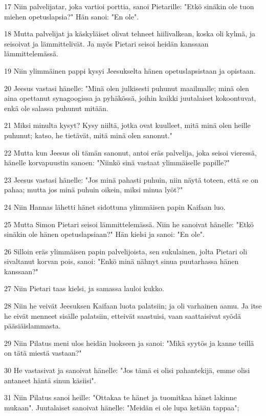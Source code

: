 \par 17 Niin palvelijatar, joka vartioi porttia, sanoi Pietarille: "Etkö sinäkin ole tuon miehen opetuslapsia?" Hän sanoi: "En ole".
\par 18 Mutta palvelijat ja käskyläiset olivat tehneet hiilivalkean, koska oli kylmä, ja seisoivat ja lämmittelivät. Ja myös Pietari seisoi heidän kanssaan lämmittelemässä.
\par 19 Niin ylimmäinen pappi kysyi Jeesukselta hänen opetuslapsistaan ja opistaan.
\par 20 Jeesus vastasi hänelle: "Minä olen julkisesti puhunut maailmalle; minä olen aina opettanut synagoogissa ja pyhäkössä, joihin kaikki juutalaiset kokoontuvat, enkä ole salassa puhunut mitään.
\par 21 Miksi minulta kysyt? Kysy niiltä, jotka ovat kuulleet, mitä minä olen heille puhunut; katso, he tietävät, mitä minä olen sanonut."
\par 22 Mutta kun Jeesus oli tämän sanonut, antoi eräs palvelija, joka seisoi vieressä, hänelle korvapuustin sanoen: "Niinkö sinä vastaat ylimmäiselle papille?"
\par 23 Jeesus vastasi hänelle: "Jos minä pahasti puhuin, niin näytä toteen, että se on pahaa; mutta jos minä puhuin oikein, miksi minua lyöt?"
\par 24 Niin Hannas lähetti hänet sidottuna ylimmäisen papin Kaifaan luo.
\par 25 Mutta Simon Pietari seisoi lämmittelemässä. Niin he sanoivat hänelle: "Etkö sinäkin ole hänen opetuslapsiaan?" Hän kielsi ja sanoi: "En ole".
\par 26 Silloin eräs ylimmäisen papin palvelijoista, sen sukulainen, jolta Pietari oli sivaltanut korvan pois, sanoi: "Enkö minä nähnyt sinua puutarhassa hänen kanssaan?"
\par 27 Niin Pietari taas kielsi, ja samassa lauloi kukko.
\par 28 Niin he veivät Jeesuksen Kaifaan luota palatsiin; ja oli varhainen aamu. Ja itse he eivät menneet sisälle palatsiin, etteivät saastuisi, vaan saattaisivat syödä pääsiäislammasta.
\par 29 Niin Pilatus meni ulos heidän luokseen ja sanoi: "Mikä syytös ja kanne teillä on tätä miestä vastaan?"
\par 30 He vastasivat ja sanoivat hänelle: "Jos tämä ei olisi pahantekijä, emme olisi antaneet häntä sinun käsiisi".
\par 31 Niin Pilatus sanoi heille: "Ottakaa te hänet ja tuomitkaa hänet lakinne mukaan". Juutalaiset sanoivat hänelle: "Meidän ei ole lupa ketään tappaa";
